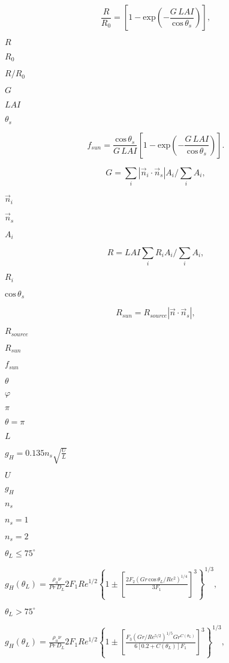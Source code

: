 \documentclass{article}
\begin{document}
\[\dfrac{R}{R_0}=\left[1-\mathrm{exp}\left(-\dfrac{G\,LAI}{\mathrm{cos}\,\theta_s}\right)\right],\]
\pagebreak

$R$
\pagebreak

$R_0$
\pagebreak

$R/R_0$
\pagebreak

$G$
\pagebreak

$LAI$
\pagebreak

$\theta_s$
\pagebreak

\[f_{sun}=\dfrac{\mathrm{cos}\,\theta_s}{G\,LAI}\left[1-\mathrm{exp}\left(-\dfrac{G\,LAI}{\mathrm{cos}\,\theta_s}\right)\right].\]
\pagebreak

\[G = \sum\limits_i |\vec{n}_i \cdot \vec{n}_s |A_i/\sum\limits_i A_i,\]
\pagebreak

$\vec{n}_i$
\pagebreak

$\vec{n}_s$
\pagebreak

$A_i$
\pagebreak

\[R = LAI\sum\limits_i R_i A_i / \sum\limits_i A_i,\]
\pagebreak

$R_i$
\pagebreak

$\mathrm{cos}\,\theta_s$
\pagebreak

\[R_{sun} = R_{source}|\vec{n} \cdot \vec{n}_s|,\]
\pagebreak

$R_{source}$
\pagebreak

$R_{sun}$
\pagebreak

$f_{sun}$
\pagebreak

$\theta$
\pagebreak

$\varphi$
\pagebreak

$\pi$
\pagebreak

$\theta=\pi$
\pagebreak

$L$
\pagebreak

$g_H = 0.135 n_s\sqrt{\frac{U}{L}}$
\pagebreak

$U$
\pagebreak

$g_H$
\pagebreak

$n_s$
\pagebreak

$n_s=1$
\pagebreak

$n_s=2$
\pagebreak

$\theta_L\leq 75^\circ$
\pagebreak

$g_H(\theta_L)=\frac{\rho_a \nu}{Pr\,D_L}2F_1Re^{1/2}\left\{1\pm\left[\frac{2F_2\left(Gr\,\mathrm{cos}\,\theta_L/Re^2\right)^{1/4}}{3F_1}\right]^3\right\}^{1/3},$
\pagebreak

$\theta_L>75^\circ$
\pagebreak

$g_H(\theta_L)=\frac{\rho_a \nu}{Pr\,D_L}2F_1Re^{1/2}\left\{1\pm\left[\frac{F_3\left(Gr/Re^{5/2}\right)^{1/5}Gr^{C(\theta_L)}}{6\left[0.2+C(\theta_L)\right]F_1}\right]^3\right\}^{1/3},$
\pagebreak
\end{document}
